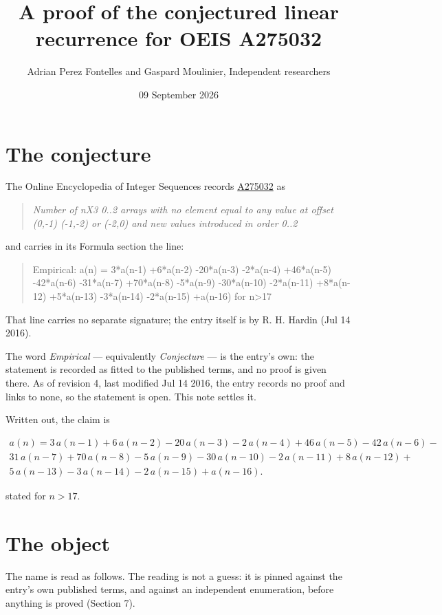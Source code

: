 \documentclass[11pt]{article}
\title{A proof of the conjectured linear recurrence for OEIS A275032}
\author{Adrian Perez Fontelles and Gaspard Moulinier, Independent researchers}
\date{09 September 2026}
\theoremstyle{definition}
\begin{document}
\maketitle
\section{The conjecture}

The Online Encyclopedia of Integer Sequences records \href{https://oeis.org/A275032}{A275032} as

\begin{quote}\itshape Number of nX3 0..2 arrays with no element equal to any value at offset (0,-1) (-1,-2) or (-2,0) and new values introduced in order 0..2\end{quote}

and carries in its Formula section the line:

\begin{quote}\ttfamily Empirical: a(n) = 3*a(n-1) +6*a(n-2) -20*a(n-3) -2*a(n-4) +46*a(n-5) -42*a(n-6) -31*a(n-7) +70*a(n-8) -5*a(n-9) -30*a(n-10) -2*a(n-11) +8*a(n-12) +5*a(n-13) -3*a(n-14) -2*a(n-15) +a(n-16) for n>17\end{quote}

That line carries no separate signature; the entry itself is by R. H. Hardin (Jul 14 2016).

The word {\itshape Empirical} --- equivalently {\itshape Conjecture} --- is the entry's own: the statement is recorded as fitted to the published terms, and no proof is given there. As of revision 4, last modified Jul 14 2016, the entry records no proof and links to none, so the statement is open. This note settles it.

Written out, the claim is

\begin{multline*} a(n) = 3\,a(n-1) + 6\,a(n-2) - 20\,a(n-3) - 2\,a(n-4) + 46\,a(n-5) - 42\,a(n-6) - \\ 31\,a(n-7) + 70\,a(n-8) - 5\,a(n-9) - 30\,a(n-10) - 2\,a(n-11) + 8\,a(n-12) + \\ 5\,a(n-13) - 3\,a(n-14) - 2\,a(n-15) + a(n-16). \end{multline*}

stated for $n > 17$.

\section{The object}

The name is read as follows. The reading is not a guess: it is pinned against the entry's own published terms, and against an independent enumeration, before anything is proved (Section 7).
\end{document}
